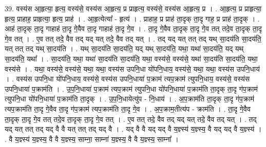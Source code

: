 \documentclass[17pt]{extarticle}
\begin{document}
39. वस्य॑स आ॒हृत्या॒ हृत्य॒ वस्य॑से॒ वस्य॑स आ॒हृत्य॒ प्र प्राहृत्य॒ वस्य॑से॒ वस्य॑स आ॒हृत्य॒ प्र । . आ॒हृत्य॒ प्र प्राहृत्या॒ हृत्य॒ प्राहाह॒ प्राहृत्या॒ हृत्य॒ प्राह॑ । . आ॒हृत्येत्या᳚ - हृत्य॑ । . प्राहाह॒ प्र प्राह॑ ता॒दृक् ता॒दृ गाह॒ प्र प्राह॑ ता॒दृक् । . आह॑ ता॒दृक् ता॒दृ गाहाह॑ ता॒दृ गे॒वैव ता॒दृ गाहाह॑ ता॒दृ गे॒व । . ता॒दृ गे॒वैव ता॒दृक् ता॒दृ गे॒व तत् तदे॒व ता॒दृक् ता॒दृ गे॒व तत् । . ए॒व तत् तदे॒ वैव तद् यद् यत् तदे॒ वैव तद् यत् । . तद् यद् यत् तत् तद् यथ् सा॒दय॑ति सा॒दय॑ति॒ यत् तत् तद् यथ् सा॒दय॑ति । . यथ् सा॒दय॑ति सा॒दय॑ति॒ यद् यथ् सा॒दय॑ति॒ यथा॒ यथा॑ सा॒दय॑ति॒ यद् यथ् सा॒दय॑ति॒ यथा᳚ । . सा॒दय॑ति॒ यथा॒ यथा॑ सा॒दय॑ति सा॒दय॑ति॒ यथा॒ वस्य॑से॒ वस्य॑से॒ यथा॑ सा॒दय॑ति सा॒दय॑ति॒ यथा॒ वस्य॑से । . यथा॒ वस्य॑से॒ वस्य॑से॒ यथा॒ यथा॒ वस्य॑स उपनि॒धा यो॑पनि॒धाय॒ वस्य॑से॒ यथा॒ यथा॒ वस्य॑स उपनि॒धाय॑ । . वस्य॑स उपनि॒धा यो॑पनि॒धाय॒ वस्य॑से॒ वस्य॑स उपनि॒धाया॑ प॒क्राम॑ त्यप॒क्राम॑ त्युपनि॒धाय॒ वस्य॑से॒ वस्य॑स उपनि॒धाया॑ प॒क्राम॑ति । . उ॒प॒नि॒धाया॑ प॒क्राम॑ त्यप॒क्राम॑ त्युपनि॒धा यो॑पनि॒धाया॑ प॒क्राम॑ति ता॒दृक् ता॒दृ ग॑प॒क्राम॑ त्युपनि॒धा यो॑पनि॒धाया॑ प॒क्राम॑ति ता॒दृक् । . उ॒प॒नि॒धायेत्यु॑प - नि॒धाय॑ । . अ॒प॒क्राम॑ति ता॒दृक् ता॒दृ ग॑प॒क्राम॑ त्यप॒क्राम॑ति ता॒दृ गे॒वैव ता॒दृ ग॑प॒क्राम॑ त्यप॒क्राम॑ति ता॒दृ गे॒व । . अ॒प॒क्राम॒तीत्य॑प - क्राम॑ति । . ता॒दृ गे॒वैव ता॒दृक् ता॒दृ गे॒व तत् तदे॒व ता॒दृक् ता॒दृ गे॒व तत् । . ए॒व तत् तदे॒ वैव तद् यद् यत् तदे॒ वैव तद् यत् । . तद् यद् यत् तत् तद् यद् वै वै यत् तत् तद् यद् वै । . यद् वै वै यद् यद् वै य॒ज्ञ्स्य॑ य॒ज्ञ्स्य॒ वै यद् यद् वै य॒ज्ञ्स्य॑ । . वै य॒ज्ञ्स्य॑ य॒ज्ञ्स्य॒ वै वै य॒ज्ञ्स्य॒ साम्ना॒ साम्ना॑ य॒ज्ञ्स्य॒ वै वै य॒ज्ञ्स्य॒ साम्ना᳚ । \newline
\end{document}
